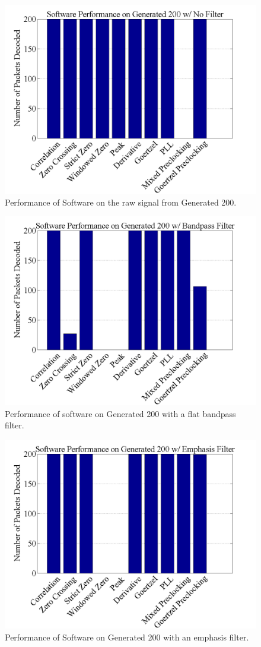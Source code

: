 \begin{figure}
  \centering
	\includegraphics[width=0.75\linewidth]{images/SoftwarePerformanceonGenerated200wNoFilter.png} 
	\caption{Performance of Software on the raw signal from Generated 200.}
   \label{Gen200FiltNo}
\end{figure}
\begin{figure}
  \centering
	\includegraphics[width=0.75\linewidth]{images/SoftwarePerformanceonGenerated200wBandpassFilter.png} 
	\caption{Performance of software on Generated 200 with a flat bandpass filter.}
   \label{Gen200Filt0}
\end{figure}
\begin{figure}
  \centering
	\includegraphics[width=0.75\linewidth]{images/SoftwarePerformanceonGenerated200wEmphasisFilter.png} 
	\caption{Performance of Software on Generated 200 with an emphasis filter.}
   \label{Gen200Filt6}
\end{figure}

